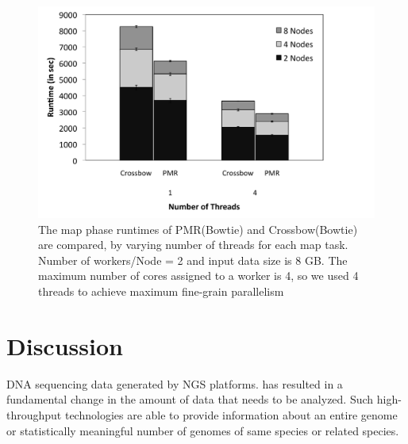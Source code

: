\documentclass{acm_proc_article-sp}
\begin{document}
\begin{figure} 
 \centering
\includegraphics[scale=0.42]{figures/fig6_bw2.pdf}
\caption{\small The map phase runtimes of PMR(Bowtie) and Crossbow(Bowtie) are compared, by varying number of threads for each map task.  Number of workers/Node = 2 and input data size is 8 GB. The maximum number of cores assigned to a worker is 4, so we used 4 threads to achieve maximum fine-grain parallelism }
  \label{fig:mulit-parallel} 
\end{figure}

\section{Discussion}\label{sec:discussions}


DNA sequencing data generated by NGS
platforms\cite{metzker2010,1000genome,wang2009-natrevgen,alex2009,mcpherson2009}.
has resulted in a fundamental change in the amount of data that needs
to be analyzed. Such high-throughput technologies are able to provide
information about an entire genome or statistically meaningful number
of genomes of same species or related species.
\end{document}
